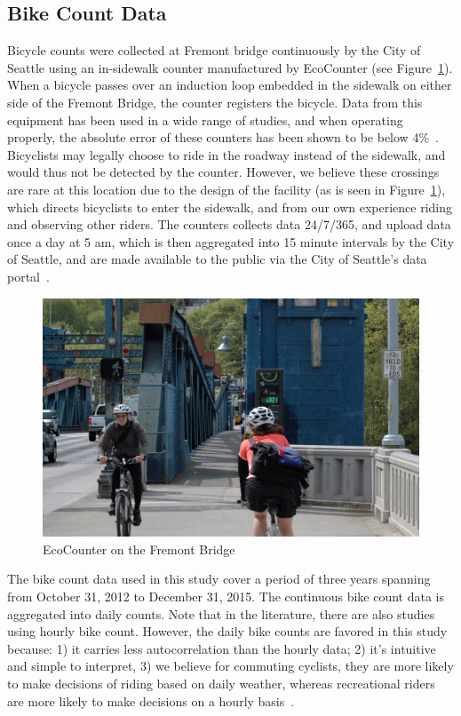 \documentclass [11pt, proquest] {uwthesis}[2015/03/03]
\begin{document}
\subsection{Bike Count Data}
Bicycle counts were collected at Fremont bridge continuously by the City of Seattle using an in-sidewalk counter manufactured by EcoCounter (see Figure~\ref{fig:ecoCounter}). When a bicycle passes over an induction loop embedded in the sidewalk on either side of the Fremont Bridge, the counter
registers the bicycle. Data from this equipment has been used in a wide range of studies, and when operating properly, the absolute error of these counters has been shown to be below 4\%~\cite{Nordback13}. Bicyclists may legally choose to ride in the roadway instead of the sidewalk, and would thus not be detected by the counter. However, we believe these crossings are rare at this location due to the design of the facility (as is seen in Figure~\ref{fig:ecoCounter}), which directs bicyclists to enter the sidewalk, and from our own experience riding and observing other riders. The counters collects data 24/7/365, and upload data once a day at 5 am, which is then aggregated into 15 minute intervals by the City of Seattle, and are made available to the public via the City of Seattle's data portal~\cite{City-of-Seattle:aa,City-of-Seattle:ab}.

\begin{figure}
   \includegraphics[width=1\textwidth]{figures/Fremont-bridge.jpg} 
  \caption{EcoCounter on the Fremont Bridge}
  \label{fig:ecoCounter}
\end{figure}

The bike count data used in this study cover a period of three years spanning from October 31, 2012 to December 31, 2015. The continuous bike count data is aggregated into daily counts. Note that in the literature, there are also studies using hourly bike count. However, the daily bike counts are favored in this study because: 1) it carries less autocorrelation than the hourly data; 2) it's intuitive and simple to interpret, 3) we believe for commuting cyclists, they are more likely to make decisions of riding based on daily weather, whereas recreational riders are more likely to make decisions on a hourly basis~\cite{Nosal:2014aa}. 
\end{document}
